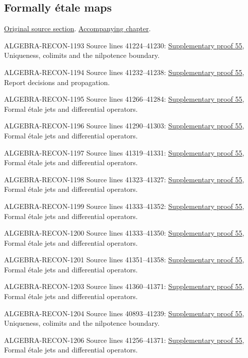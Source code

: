\subsection{Formally \'etale maps}
\hypertarget{algebra-source-section-formally-etale}{}
\noindent\href{https://github.com/stacks/stacks-project/blob/a04446e57ec1fbc252a871afcec7752fb2807b14/algebra.tex\#L41164}{Original source section}. \href{algebra.pdf\#nameddest=section-formally-etale}{Accompanying chapter}.

\begin{AlgebraSourceRoutes}
\item[ALGEBRA-RECON-1193] Source lines 41224--41230: \hyperlink{algebra_conormal_thickening_notes_20260928}{Supplementary proof 55}, Uniqueness, colimits and the nilpotence boundary.
\item[ALGEBRA-RECON-1194] Source lines 41232--41238: \hyperlink{algebra_conormal_thickening_notes_20260928}{Supplementary proof 55}, Report decisions and propagation.
\item[ALGEBRA-RECON-1195] Source lines 41266--41284: \hyperlink{algebra_conormal_thickening_notes_20260928}{Supplementary proof 55}, Formal étale jets and differential operators.
\item[ALGEBRA-RECON-1196] Source lines 41290--41303: \hyperlink{algebra_conormal_thickening_notes_20260928}{Supplementary proof 55}, Formal étale jets and differential operators.
\item[ALGEBRA-RECON-1197] Source lines 41319--41331: \hyperlink{algebra_conormal_thickening_notes_20260928}{Supplementary proof 55}, Formal étale jets and differential operators.
\item[ALGEBRA-RECON-1198] Source lines 41323--41327: \hyperlink{algebra_conormal_thickening_notes_20260928}{Supplementary proof 55}, Formal étale jets and differential operators.
\item[ALGEBRA-RECON-1199] Source lines 41333--41352: \hyperlink{algebra_conormal_thickening_notes_20260928}{Supplementary proof 55}, Formal étale jets and differential operators.
\item[ALGEBRA-RECON-1200] Source lines 41333--41350: \hyperlink{algebra_conormal_thickening_notes_20260928}{Supplementary proof 55}, Formal étale jets and differential operators.
\item[ALGEBRA-RECON-1201] Source lines 41351--41358: \hyperlink{algebra_conormal_thickening_notes_20260928}{Supplementary proof 55}, Formal étale jets and differential operators.
\item[ALGEBRA-RECON-1203] Source lines 41360--41371: \hyperlink{algebra_conormal_thickening_notes_20260928}{Supplementary proof 55}, Formal étale jets and differential operators.
\item[ALGEBRA-RECON-1204] Source lines 40893--41239: \hyperlink{algebra_conormal_thickening_notes_20260928}{Supplementary proof 55}, Uniqueness, colimits and the nilpotence boundary.
\item[ALGEBRA-RECON-1206] Source lines 41256--41371: \hyperlink{algebra_conormal_thickening_notes_20260928}{Supplementary proof 55}, Formal étale jets and differential operators.
\end{AlgebraSourceRoutes}

